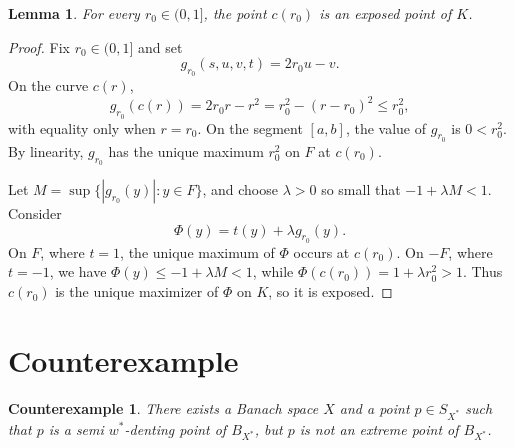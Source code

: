 \documentclass[11pt]{article}
\newtheorem*{theorem}{Counterexample}
\newtheorem*{lemma}{Lemma}
\begin{document}
\begin{lemma}
For every \(r_0\in(0,1]\), the point \(c(r_0)\) is an exposed point of \(K\).
\end{lemma}

\begin{proof}
Fix \(r_0\in(0,1]\) and set
\[
g_{r_0}(s,u,v,t)=2r_0u-v.
\]
On the curve \(c(r)\),
\[
g_{r_0}(c(r))=2r_0r-r^2=r_0^2-(r-r_0)^2\le r_0^2,
\]
with equality only when \(r=r_0\). On the segment \([a,b]\), the value of
\(g_{r_0}\) is \(0<r_0^2\). By linearity, \(g_{r_0}\) has the unique maximum
\(r_0^2\) on \(F\) at \(c(r_0)\).

Let \(M=\sup\{|g_{r_0}(y)|:y\in F\}\), and choose
\(\lambda>0\) so small that \(-1+\lambda M<1\). Consider
\[
\Phi(y)=t(y)+\lambda g_{r_0}(y).
\]
On \(F\), where \(t=1\), the unique maximum of \(\Phi\) occurs at \(c(r_0)\).
On \(-F\), where \(t=-1\), we have \(\Phi(y)\le -1+\lambda M<1\), while
\(\Phi(c(r_0))=1+\lambda r_0^2>1\). Thus \(c(r_0)\) is the unique maximizer of
\(\Phi\) on \(K\), so it is exposed.
\end{proof}

\section*{Counterexample}

\begin{theorem}
There exists a Banach space \(X\) and a point \(p\in S_{X^*}\) such that
\(p\) is a semi \(w^*\)-denting point of \(B_{X^*}\), but \(p\) is not an
extreme point of \(B_{X^*}\).
\end{theorem}
\end{document}
